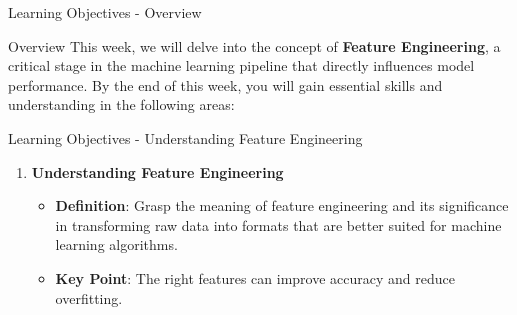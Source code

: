 \documentclass[aspectratio=169]{beamer}
\begin{document}
\begin{frame}[fragile]{Learning Objectives - Overview}
    \begin{block}{Overview}
        This week, we will delve into the concept of \textbf{Feature Engineering}, a critical stage in the machine learning pipeline that directly influences model performance. By the end of this week, you will gain essential skills and understanding in the following areas:
    \end{block}
\end{frame}

\begin{frame}[fragile]{Learning Objectives - Understanding Feature Engineering}
    \begin{enumerate}
        \item \textbf{Understanding Feature Engineering}
            \begin{itemize}
                \item \textbf{Definition}: Grasp the meaning of feature engineering and its significance in transforming raw data into formats that are better suited for machine learning algorithms.
                \item \textbf{Key Point}: The right features can improve accuracy and reduce overfitting.
            \end{itemize}
    \end{enumerate}
\end{frame}
\end{document}
